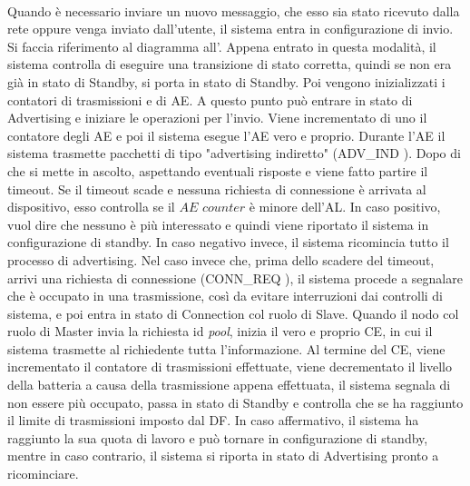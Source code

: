 \\
Quando è necessario inviare un nuovo messaggio, che esso sia stato ricevuto dalla rete oppure venga inviato dall'utente, il sistema entra in configurazione di invio. Si faccia riferimento al diagramma all'. Appena entrato in questa modalità, il sistema controlla di eseguire una transizione di stato corretta, quindi se non era già in stato di Standby, si porta in stato di Standby. Poi vengono inizializzati i contatori di trasmissioni e di \acs{AE}. A questo punto può entrare in stato di Advertising e iniziare le operazioni per l'invio. Viene incrementato di uno il contatore degli AE e poi il sistema esegue l'\acs{AE} vero e proprio. Durante l'\acs{AE} il sistema trasmette pacchetti di tipo "advertising indiretto" (ADV\_IND \cite{BT-CoreSpec4.0}). Dopo di che si mette in ascolto, aspettando eventuali risposte e viene fatto partire il timeout. Se il timeout scade e nessuna richiesta di connessione è arrivata al dispositivo, esso controlla se il $\textit{AE counter}$ è minore dell'AL. In caso positivo, vuol dire che nessuno è più interessato e quindi viene riportato il sistema in configurazione di standby. In caso negativo invece, il sistema ricomincia tutto il processo di advertising. Nel caso invece che, prima dello scadere del timeout, arrivi una richiesta di connessione (CONN\_REQ \cite{BT-CoreSpec4.0}), il sistema procede a segnalare che è occupato in una trasmissione, così da evitare interruzioni dai controlli di sistema, e poi entra in stato di Connection col ruolo di Slave. Quando il nodo col ruolo di Master invia la richiesta id \textit{pool}, inizia il vero e proprio \acf{CE}, in cui il sistema trasmette al richiedente tutta l'informazione. Al termine del \acs{CE}, viene incrementato il contatore di trasmissioni effettuate, viene decrementato il livello della batteria a causa della trasmissione appena effettuata, il sistema segnala di non essere più occupato, passa in stato di Standby e controlla che se ha raggiunto il limite di trasmissioni imposto dal DF. In caso affermativo, il sistema ha raggiunto la sua quota di lavoro e può tornare in configurazione di standby, mentre in caso contrario, il sistema si riporta in stato di Advertising pronto a ricominciare.
\bigskip


